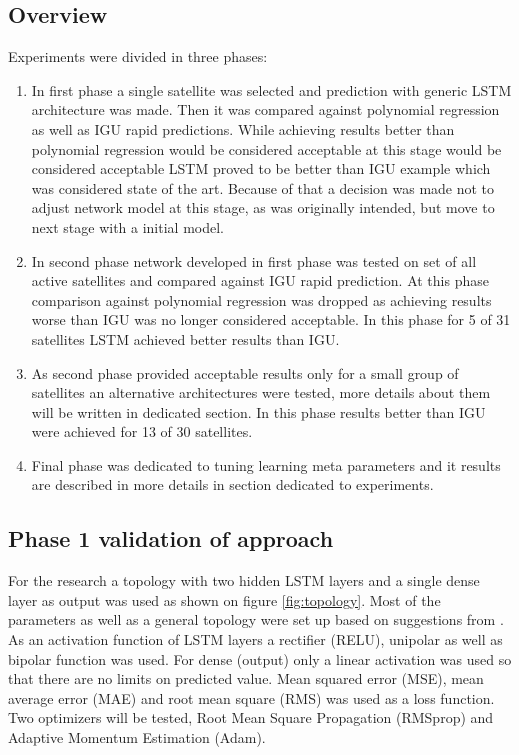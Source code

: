 \documentclass{kybernetika}
\begin{document}
\subsection{Overview}
Experiments were divided in three phases:
\begin{enumerate}
\item In first phase a single satellite was selected and prediction with generic LSTM architecture
	was made. Then it was compared against polynomial regression as well as IGU rapid predictions.
	While achieving results better than polynomial regression would be considered acceptable at 
	this stage would be considered acceptable LSTM proved to be better than IGU example which
	was considered state of the art. Because of that a decision was made not to adjust network
	model at this stage, as was originally intended, but move to next stage with a initial model.

\item In second phase network developed in first phase was tested on set of all active 
	satellites and compared against IGU rapid prediction. At this phase comparison against 
	polynomial regression was dropped as achieving results worse than IGU was no longer 
	considered acceptable. In this phase for 5 of 31 satellites LSTM achieved better 
	results than IGU.

\item As second phase provided acceptable results only for a small group of satellites 
	an alternative architectures were tested, more details about them will be written in 
	dedicated section. In this phase results better than IGU were achieved 
	for 13 of 30 satellites.
\item Final phase was dedicated to tuning learning meta parameters and it results are described
	in more details in section dedicated to experiments.

\end{enumerate}

\subsection{Phase 1 validation of approach}
For the research a topology with two hidden LSTM layers and a single dense layer as output was 
used as shown on figure \ref{fig:topology}.
Most of the parameters as well as a general topology were set up based on suggestions from 
\cite{Chollet2018}. As an activation function of LSTM layers a rectifier (RELU),
unipolar as well as bipolar function was used.
For dense (output) only a linear activation was used so that there are no limits on predicted 
value.
Mean squared error (MSE), mean average error (MAE) and root mean square (RMS)
was used as a loss function.
Two optimizers will be tested, Root Mean Square Propagation (RMSprop)\cite{Hinton2012} and 
Adaptive Momentum Estimation (Adam)\cite{Kingma2015}.
\end{document}
